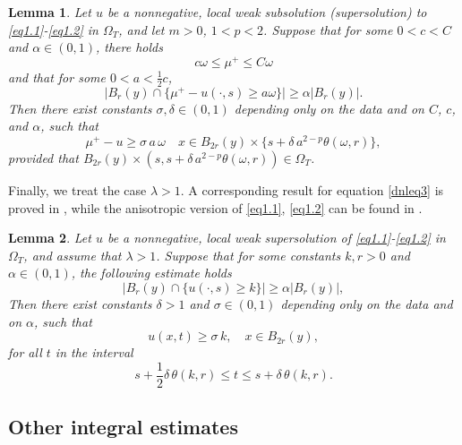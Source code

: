 \documentclass[a4paper,11pt,fullpage]{article}
\numberwithin{equation}{section}
\newtheorem{lemma}{Lemma}[section]
\begin{document}
\begin{lemma}\label{new_exp_lem}
Let $u$ be a nonnegative, local weak subsolution (supersolution) to \eqref{eq1.1}-\eqref{eq1.2} in $\Omega_T$, and let $m>0$, $1<p<2$. Suppose that for some $0<c<C$ and $\alpha\in(0,1)$, there holds
$$c\omega\leqslant \mu^+ \leqslant C\omega$$
and that for some $0<a < \frac12c$, 
\begin{equation*}
\Big|B_{r}(y)\cap \big\{\mu^{+}-u(\cdot, s)\geqslant a\omega\big\}\Big|\geqslant \alpha |B_r(y)|.
\end{equation*}
Then there exist constants $\sigma,\delta\in(0,1)$ depending only on the data and on $C$,  $c$, and $\alpha$, such that 
\begin{equation*}
\mu^{+}-u\geqslant \sigma\, a\, \omega
\quad x\in B_{2r}(y)\times\{s+\delta\,a^{2-p}\theta(\omega,r)\},
\end{equation*}
provided that $B_{2r}(y)\times\left(s,s+\delta\,a^{2-p}\theta(\omega,r)\right)\in\Omega_T$.
\end{lemma}

Finally, we treat the case $\lambda>1$. A corresponding result for equation \eqref{dnleq3} is proved in \cite[Proposition~4.3]{Hen2022}, while the anisotropic version of \eqref{eq1.1}, \eqref{eq1.2} can be found in \cite[Theorem~3.1]{CiaHenSavSkr2025-1}.

\begin{lemma}\label{deg_exp_lem}
Let $u$ be a nonnegative, local weak supersolution of \eqref{eq1.1}-\eqref{eq1.2} in $\Omega_T$, and assume that $\lambda>1$. Suppose that for some constants $k, r>0$ and $\alpha \in (0, 1)$, the following estimate holds
\begin{equation*}
|B_r(y)\cap\{u(\cdot, s)\geqslant k\}|\geqslant \alpha |B_r(y)|,
\end{equation*}
Then there exist constants  $\delta>1$ and $\sigma\in(0,1)$ depending only on the data and on $\alpha$, such that
\begin{equation*}
u(x, t)\geqslant \sigma\,k,\quad x\in B_{2r}(y),
\end{equation*}
for all $t$ in the interval
\begin{equation*}
s+ \frac{1}{2} \delta\,\theta(k,r) \leqslant t\leqslant s+ \delta \,\theta(k,r).
\end{equation*}
\end{lemma}


\subsection{Other integral estimates}
\end{document}
